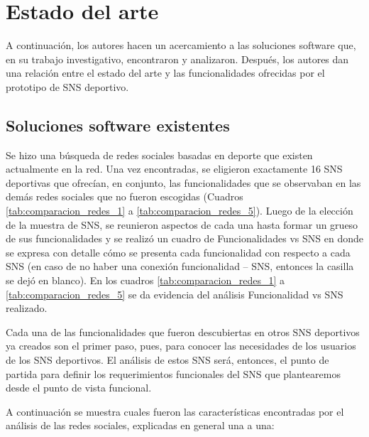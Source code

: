 \section{Estado del arte} \label{cap:estado_arte}

A continuación, los autores hacen un acercamiento a las soluciones software que, en su trabajo investigativo, encontraron y analizaron. Después, los autores dan una relación entre el estado del arte y las funcionalidades ofrecidas por el prototipo de SNS deportivo.

\subsection{Soluciones software existentes}

Se hizo una búsqueda de redes sociales basadas en deporte que existen actualmente en la red. Una vez encontradas, se eligieron exactamente 16 SNS deportivas que ofrecían, en conjunto, las funcionalidades que se observaban en las demás redes sociales que no fueron escogidas (Cuadros \ref{tab:comparacion_redes_1} a \ref{tab:comparacion_redes_5}). Luego de la elección de la muestra de SNS, se reunieron aspectos de cada una hasta formar un grueso de sus funcionalidades y se realizó un cuadro de Funcionalidades vs SNS en donde se expresa con detalle cómo se presenta cada funcionalidad con respecto a cada SNS (en caso de no haber una conexión funcionalidad – SNS, entonces la casilla se dejó en blanco). En los cuadros \ref{tab:comparacion_redes_1} a \ref{tab:comparacion_redes_5} se da evidencia del análisis Funcionalidad vs SNS realizado.

Cada una de las funcionalidades que fueron descubiertas en otros SNS deportivos ya creados son el primer paso, pues, para conocer las necesidades de los usuarios de los SNS deportivos. El análisis de estos SNS será, entonces, el punto de partida para definir los requerimientos funcionales del SNS que plantearemos desde el punto de vista funcional.

A continuación se muestra cuales fueron las características encontradas por el análisis de las redes sociales, explicadas en general una a una:

